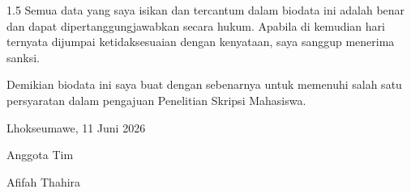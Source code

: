 \documentclass[12pt, a4paper, onecolumn, oneside]{report}
\begin{document}
\begin{spacing}{1.5}
\vspace{0.3cm}
\hspace{1cm} Semua data yang saya isikan dan tercantum dalam biodata ini adalah benar dan dapat dipertanggungjawabkan secara hukum. Apabila di kemudian hari ternyata dijumpai ketidaksesuaian dengan kenyataan, saya sanggup menerima sanksi.

\hspace{1cm} Demikian biodata ini saya buat dengan sebenarnya untuk memenuhi salah satu persyaratan dalam pengajuan Penelitian Skripsi Mahasiswa.

\vspace{1.0cm}
\noindent\hfill Lhokseumawe, 11 Juni 2026

\noindent\hfill Anggota Tim

\vspace{2.0cm}

\noindent\hfill Afifah Thahira

\end{spacing}
\end{document}
